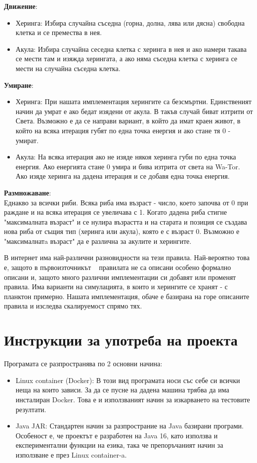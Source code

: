 \documentclass{article}
\begin{document}
\bigbreak
\textbf{Движение}:
\begin{itemize}
	\item Херинга: Избира случайна съседна (горна, долна, лява или дясна) свободна клетка и се премества в нея.
	\item Акула: Избира случайна сеседна клетка с херинга в нея и ако намери такава се мести там и изяжда херингата,
		а ако няма съседна клетка с херинга се мести на случайна съседна клетка. 
\end{itemize}

\textbf{Умиране}:
\begin{itemize}
	\item Херинга: При нашата имплементация херингите са безсмъртни. Единственият начин да умрат е ако бедат изядени
		от акула. В такъв случай биват изтрити от Света. Възможно е да се направи вариант, в който да имат краен живот,
		в който на всяка итерация губят по една точка енергия и ако стане тя 0 - умират.
	\item Акула: На всяка итерация ако не изяде някоя херинга губи по една точка енергия. Ако енергията стане 0
		умира и бива изтрита от света на Wa-Tor. Ако изяде херинга на дадена итерация и се добавя една точка енергия.
\end{itemize}

\textbf{Размножаване}:
\\
Еднакво за всички риби. Всяка риба има възраст - число, което започва от 0 при раждане и на всяка итерация
се увеличава с 1. Когато дадена риба стигне "максималната възраст" и се нулира възрастта и на старата и позиция се създава нова
риба от същия тип (херинга или акула), която е с възраст 0. Възможно е "максималнатa възраст" да е различна за акулите и херингите.

\bigbreak
В интернет има най-различни разновидности на тези правила. Най-вероятно това е, защото в първоизточникът ~\cite{wator}
правилата не са описани особено формално описани и, защото много различни имплементации си добавят или променят правила.
Има варианти на симулацията, в които и херингите се хранят - с планктон примерно. Нашата имплементация, обаче
е базирана на горе описаните правила и изследва скалируемост спрямо тях.

\section{Инструкции за употреба на проекта}
Програмата се разпространява по 2 основни начина:

\begin{itemize}
	\item Linux container (Docker): В този вид програмата носи със себе си всички неща на които зависи.
		За да се пусне на дадена машина трябва да има инсталиран Docker. Това е и използваният начин
		за изкарването на тестовите резултати.
	\item Java JAR: Стандартен начин за разпространие на Java базирани програми. Особеност е, че проектът
		е разработен на Java 16, като използва и експериментални функции на езика, така че
		препоръчаният начин за използване е през Linux container-a.
\end{itemize}
\end{document}
